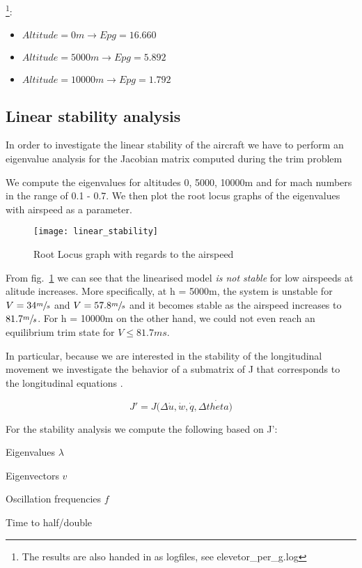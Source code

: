 \footnote{The results are also handed in as logfiles, see elevetor\_per\_g.log}:
\begin{itemize}
    \item $Altitude = 0 m\rightarrow Epg = 16.660$
    \item $Altitude = 5000 m \rightarrow Epg = 5.892$
    \item $Altitude = 10000 m \rightarrow Epg = 1.792$
\end{itemize}


\subsection{Linear stability analysis}

In order to investigate the linear stability of the aircraft we have to perform
an eigenvalue analysis for the Jacobian matrix computed during the trim problem

We compute the eigenvalues for altitudes 0, 5000, 10000m and for mach numbers
in the range of 0.1 - 0.7. We then plot the root locus graphs of the
eigenvalues with airspeed as a parameter.

\begin{figure}[H]
    \centering
    \texttt{[image: linear\_stability]}
    \caption{Root Locus graph with regards to the airspeed}
    \label{fig:rlocus_airspeed}
\end{figure}

From fig.~\ref{fig:rlocus_airspeed} we can see that the linearised model
\textit{is not stable} for low airspeeds at alitude increases. More
specifically, at h = 5000m, the system is unstable for $V = 34\sfrac{m}{s}$
and $V = 57.8\sfrac{m}{s}$ and it becomes stable as the airspeed increases to 
$81.7\sfrac{m}{s}$. For h = 10000m on the other hand, we could not even reach an 
equilibrium trim state for $V \leq 81.7 {m}{s}$.

In particular, because we are interested in the stability of the longitudinal
movement we investigate the behavior of a submatrix of J that corresponds to the
longitudinal equations \cite{etkin_dynamics_1972}.

\begin{equation}
    J' = J\big(\Delta \dot{u}, \dot{w}, \dot{q}, \Delta
    \dot{theta}\big)\label{eqn:Jlong}
\end{equation}

For the stability analysis we compute the following based on J':
\begin{itemize*}
    \item Eigenvalues $\lambda$
    \item Eigenvectors $v$
    \item Oscillation frequencies $f$
    \item Time to half/double
\end{itemize*}

